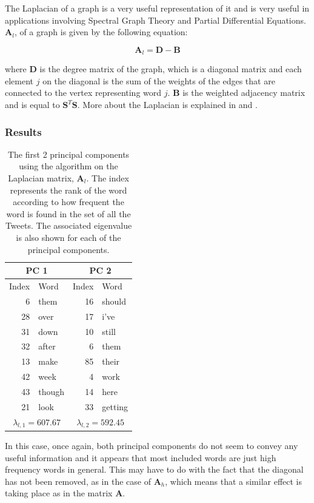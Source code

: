 \documentclass[11pt,a4paper]{article}
\newcommand{\smat}{\mathbf{S}}
\newcommand{\covmat}{\mathbf{A}}
\newcommand{\tp}{^T}
\begin{document}
The Laplacian of a graph is a very useful representation of it and is very useful in applications involving Spectral Graph Theory and Partial Differential Equations. $\mathbf{A}_{l}$, of a graph is given by the following equation:

\begin{equation}
\mathbf{A}_{l} = \mathbf{D} - \mathbf{B}
\end{equation}

where $\mathbf{D}$ is the degree matrix of the graph, which is a diagonal matrix and each element $j$ on the diagonal is the sum of the weights of the edges that are connected to the vertex representing word $j$. $\mathbf{B}$ is the weighted adjacency matrix and is equal to $\smat\tp\smat$. More about the Laplacian is explained in \cite{laplacian} and \cite{laplacian_spielman}. 

\subsubsection*{Results}
\begin{table}[H]
\center
\begin{tabular}{| r| l | r| l |}
\hline
\multicolumn{2}{|c|}{PC 1} & \multicolumn{2}{|c|}{PC 2}\\
\hline
Index & Word & Index & Word\\
\hline
6 & them & 16 & should\\
28 & over & 17 & i've\\
31 & down & 10 & still\\
32 & after & 6 & them \\
13 & make & 85 & their\\
42 & week & 4 & work\\
43 & though & 14 & here\\
21 & look & 33 & getting\\
\hline
\multicolumn{2}{|c|}{ $\lambda_{l, 1} =  607.67$}  & \multicolumn{2}{|c|}{ $\lambda_{l, 2} = 592.45$}  \\

\hline
\end{tabular}
\caption{The first 2 principal components using the algorithm on the Laplacian matrix, $ \mathbf{A}_l$. The index represents the rank of the word according to how frequent the word is found in the set of all the Tweets. The associated eigenvalue is also shown for each of the principal components.}
\end{table}

In this case, once again, both principal components do not seem to convey any useful information and it appears that most included words are just high frequency words in general. This may have to do with the fact that the diagonal has not been removed, as in the case of $\covmat_h$, which means that a similar effect is taking place as in the matrix $\covmat$.
\end{document}
